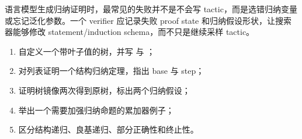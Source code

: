 \begin{aibox}
语言模型生成归纳证明时，最常见的失败并不是不会写 tactic，而是选错归纳变量或忘记泛化参数。一个 verifier 应记录失败 proof state 和归纳假设形状，让搜索器能够修改 statement/induction schema，而不只是继续采样 tactic。
\end{aibox}

\begin{checkpointbox}
\begin{enumerate}
  \item 自定义一个带叶子值的树，并写  与 ；
  \item 对列表证明一个结构归纳定理，指出 base 与 step；
  \item 证明树镜像两次得到原树，标出两个归纳假设；
  \item 举出一个需要加强归纳命题的累加器例子；
  \item 区分结构递归、良基递归、部分正确性和终止性。
\end{enumerate}
\end{checkpointbox}
